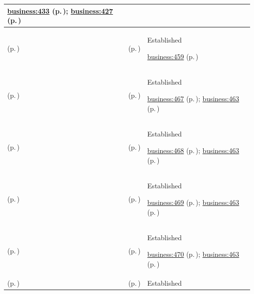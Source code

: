 \begin{longtable}{|>{\raggedright\arraybackslash}p{0.27\TableWidth}|>{\raggedright\arraybackslash}p{0.27\TableWidth}|>{\raggedright\arraybackslash}p{0.46\TableWidth}|}
 \hyperref[rad:business:429]{business:433} (p.\,\pageref{rad:business:429}); \hyperref[rad:business:427]{business:427} (p.\,\pageref{rad:business:427})\\\hline
\nameref{cap:bc-diagnostic-therapeutic-clinical-support-services} (p.\,\pageref{cap:bc-diagnostic-therapeutic-clinical-support-services}) & \nameref{cap:bc-diagnostic-support-provision} (p.\,\pageref{cap:bc-diagnostic-support-provision}) & Established

 \hyperref[rad:business:459]{business:459} (p.\,\pageref{rad:business:459})\\\hline
\nameref{cap:bc-diagnostic-support-provision} (p.\,\pageref{cap:bc-diagnostic-support-provision}) & \nameref{cap:bc-diagnostic-service-appointment-management} (p.\,\pageref{cap:bc-diagnostic-service-appointment-management}) & Established

 \hyperref[rad:business:465]{business:467} (p.\,\pageref{rad:business:465}); \hyperref[rad:business:463]{business:463} (p.\,\pageref{rad:business:463})\\\hline
\nameref{cap:bc-diagnostic-support-provision} (p.\,\pageref{cap:bc-diagnostic-support-provision}) & \nameref{cap:bc-diagnostic-service-delivery} (p.\,\pageref{cap:bc-diagnostic-service-delivery}) & Established

 \hyperref[rad:business:465]{business:468} (p.\,\pageref{rad:business:465}); \hyperref[rad:business:463]{business:463} (p.\,\pageref{rad:business:463})\\\hline
\nameref{cap:bc-diagnostic-support-provision} (p.\,\pageref{cap:bc-diagnostic-support-provision}) & \nameref{cap:bc-diagnostic-specimen-management} (p.\,\pageref{cap:bc-diagnostic-specimen-management}) & Established

 \hyperref[rad:business:465]{business:469} (p.\,\pageref{rad:business:465}); \hyperref[rad:business:463]{business:463} (p.\,\pageref{rad:business:463})\\\hline
\nameref{cap:bc-diagnostic-support-provision} (p.\,\pageref{cap:bc-diagnostic-support-provision}) & \nameref{cap:bc-diagnostic-data-management} (p.\,\pageref{cap:bc-diagnostic-data-management}) & Established

 \hyperref[rad:business:465]{business:470} (p.\,\pageref{rad:business:465}); \hyperref[rad:business:463]{business:463} (p.\,\pageref{rad:business:463})\\\hline
\nameref{cap:bc-diagnostic-support-provision} (p.\,\pageref{cap:bc-diagnostic-support-provision}) & \nameref{cap:bc-diagnostic-interpretation} (p.\,\pageref{cap:bc-diagnostic-interpretation}) & Established


\end{longtable}
